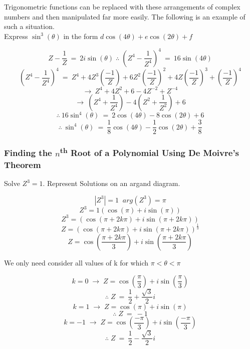 \documentclass{article}
\begin{document}
\noindent Trigonometric functions can be replaced with these arrangements of
complex numbers and then manipulated far more easily. The following is an
example of such a situation. \\


\noindent Express \(\sin^3\left(\theta\right)\) in the form
\(d\cos\left(4\theta\right)+e\cos\left(2\theta\right)+f\)

\[Z-\frac{1}{Z} \:=\: 2i\sin\left(\theta\right) \;\therefore\;
\left(Z^4-\frac{1}{Z^4}\right)^4 \:=\: 16\sin\left(4\theta\right)\]
\[\left(Z^4-\frac{1}{Z^4}\right)^4 \:=\:
Z^4+4Z^3\left(\frac{-1}{Z}\right)+6Z^2\left(\frac{-1}{Z}\right)^2+4Z\left(\frac{-1}{Z}\right)^3+\left(\frac{-1}{Z}\right)^4\]
\[\rightarrow\: Z^4+4Z^2+6-4Z^{-2}+Z^{-4}\] \[\rightarrow\:
\left(Z^4+\frac{1}{Z^4}\right)-4\left(Z^2+\frac{1}{Z^2}\right)+6\]
\[\therefore\: 16\sin^4\left(\theta\right) \:=\:
2\cos\left(4\theta\right)-8\cos\left(2\theta\right)+6\] \[\therefore\:
\sin^4\left(\theta\right) \:=\:
\frac{1}{8}\cos\left(4\theta\right)-\frac{1}{2}\cos\left(2\theta\right)+\frac{3}{8}\]

\subsubsection{Finding the $n$\textsuperscript{th} Root of a Polynomial Using De
Moivre's Theorem}

Solve \(Z^3=1\). Represent Solutions on an argand diagram.

\[|Z^3|=1 \;\; arg(Z^3)=\pi\]
\[Z^3=1\left(\cos\left(\pi\right)+i\sin\left(\pi\right)\right)\]
\[Z^3=\left(\cos\left(\pi+2k\pi\right)+i\sin\left(\pi+2k\pi\right)\right)\]
\[Z=\left(\cos\left(\pi+2k\pi\right)+i\sin\left(\pi+2k\pi\right)\right)^{\frac{1}{3}}\]
\[Z=\cos\left(\frac{\pi+2k\pi}{3}\right)+i\sin\left(\frac{\pi+2k\pi}{3}\right)\]

\noindent We only need consider all values of k for which \(\pi<\theta<\pi\)

\[k=0 \;\rightarrow\; Z=\cos\left(\frac{\pi}{3}\right)+i\sin\left(\frac{\pi}{3}\right)\]
\[\therefore \; Z \:=\: \frac{1}{2}+\frac{\sqrt{3}}{2}i\]
\[k=1 \;\rightarrow\; Z=\cos\left(\pi\right)+i\sin\left(\pi\right)\]
\[\therefore \; Z \:=\: -1\]
\[k=-1 \;\rightarrow\; Z=\cos\left(\frac{-\pi}{3}\right)+i\sin\left(\frac{-\pi}{3}\right)\]
\[\therefore \; Z \:=\: \frac{1}{2}-\frac{\sqrt{3}}{2}i\]
\end{document}
